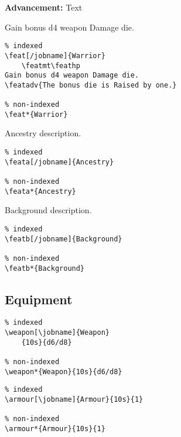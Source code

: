 \documentclass[itdr]{subfiles}
\begin{document}
\noindent\fbox{\lstinline!\\featmt!} \featmt

\vspace{-1ex}

\noindent\fbox{\lstinline!\\feathp!} \feathp

\vspace{-1ex}

\noindent{} \textbf{Advancement:} Text

\featmt\feathp
Gain bonus d4 weapon Damage die.

\begin{lstlisting}
% indexed
\feat[/jobname]{Warrior}
	\featmt\feathp
Gain bonus d4 weapon Damage die.
\featadv{The bonus die is Raised by one.}

% non-indexed
\feat*{Warrior}
\end{lstlisting}

Ancestry description.

\begin{lstlisting}
% indexed
\feata[/jobname]{Ancestry}

% non-indexed
\feata*{Ancestry}
\end{lstlisting}

Background description.

\begin{lstlisting}
% indexed
\featb[/jobname]{Background}

% non-indexed
\featb*{Background}
\end{lstlisting}

\break

\subsection{Equipment}

\begin{lstlisting}
% indexed
\weapon[\jobname]{Weapon}
	{10s}{d6/d8}

% non-indexed
\weapon*{Weapon}{10s}{d6/d8}
\end{lstlisting}

\begin{lstlisting}
% indexed
\armour[\jobname]{Armour}{10s}{1}

% non-indexed
\armour*{Armour}{10s}{1}
\end{lstlisting}
\end{document}
